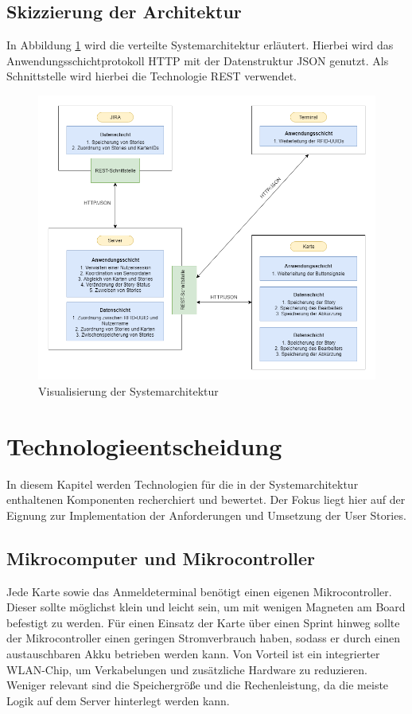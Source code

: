 \documentclass[12pt,titlepage]{scrartcl}
\begin{document}
		\subsection{Skizzierung der Architektur}
		In Abbildung \ref{fig:Architekturskizze} wird die verteilte Systemarchitektur erläutert. Hierbei wird das Anwendungsschichtprotokoll HTTP mit der Datenstruktur JSON genutzt. Als Schnittstelle wird hierbei die Technologie REST verwendet.  \\
		\begin{figure}[htbp] 
  			\centering
    		\includegraphics[height=0.55\textheight]{Architekturdiagramm}
  			\caption{Visualisierung der Systemarchitektur}
  			\label{fig:Architekturskizze}
		\end{figure}
	\newpage	
	\section{Technologieentscheidung}
	In diesem Kapitel werden Technologien für die in der Systemarchitektur enthaltenen Komponenten recherchiert und bewertet. Der Fokus liegt hier auf der Eignung zur Implementation der Anforderungen und Umsetzung der User Stories.
		\subsection{Mikrocomputer und Mikrocontroller}
		Jede Karte sowie das Anmeldeterminal benötigt einen eigenen Mikrocontroller. Dieser sollte möglichst klein und leicht sein, um mit wenigen Magneten am Board befestigt zu werden. Für einen Einsatz der Karte über einen Sprint hinweg sollte der Mikrocontroller einen geringen Stromverbrauch haben, sodass er durch einen austauschbaren Akku betrieben werden kann. Von Vorteil ist ein integrierter WLAN-Chip, um Verkabelungen und zusätzliche Hardware zu reduzieren. Weniger relevant sind die Speichergröße und die Rechenleistung, da die meiste Logik auf dem Server hinterlegt werden kann. 
\end{document}
